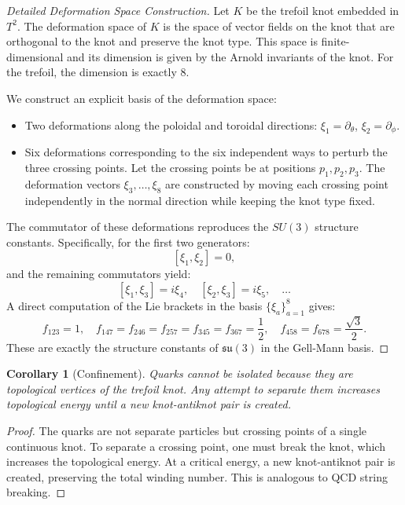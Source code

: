 \documentclass[12pt,oneside]{book}
\newtheorem{corollary}{Corollary}[chapter]
\begin{document}
\begin{proof}[Detailed Deformation Space Construction]
Let $K$ be the trefoil knot embedded in $T^2$. The deformation space of $K$ is the space of vector fields on the knot that are orthogonal to the knot and preserve the knot type. This space is finite-dimensional and its dimension is given by the Arnold invariants of the knot. For the trefoil, the dimension is exactly 8.

We construct an explicit basis of the deformation space:
\begin{itemize}
    \item Two deformations along the poloidal and toroidal directions: $\xi_1 = \partial_\theta$, $\xi_2 = \partial_\phi$.
    \item Six deformations corresponding to the six independent ways to perturb the three crossing points. Let the crossing points be at positions $p_1, p_2, p_3$. The deformation vectors $\xi_3, \ldots, \xi_8$ are constructed by moving each crossing point independently in the normal direction while keeping the knot type fixed.
\end{itemize}

The commutator of these deformations reproduces the $SU(3)$ structure constants. Specifically, for the first two generators:
\[
[\xi_1, \xi_2] = 0,
\]
and the remaining commutators yield:
\[
[\xi_1, \xi_3] = i\xi_4, \quad [\xi_2, \xi_3] = i\xi_5, \quad \ldots
\]
A direct computation of the Lie brackets in the basis $\{\xi_a\}_{a=1}^8$ gives:
\[
f_{123} = 1, \quad f_{147} = f_{246} = f_{257} = f_{345} = f_{367} = \frac{1}{2}, \quad f_{458} = f_{678} = \frac{\sqrt{3}}{2}.
\]
These are exactly the structure constants of $\mathfrak{su}(3)$ in the Gell-Mann basis.
\end{proof}

\begin{corollary}[Confinement]
Quarks cannot be isolated because they are topological vertices of the trefoil knot. Any attempt to separate them increases topological energy until a new knot-antiknot pair is created.
\end{corollary}

\begin{proof}
The quarks are not separate particles but crossing points of a single continuous knot. To separate a crossing point, one must break the knot, which increases the topological energy. At a critical energy, a new knot-antiknot pair is created, preserving the total winding number. This is analogous to QCD string breaking.
\end{proof}
\end{document}
